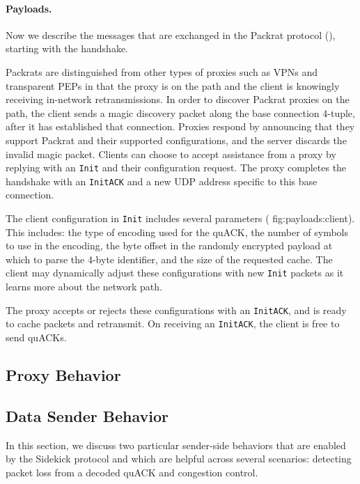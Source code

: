 

\paragraph{Payloads.} Now we describe the messages that are exchanged in the
Packrat protocol (), starting with the handshake.

Packrats are distinguished from other types of proxies such as VPNs and
transparent PEPs in that the proxy is on the path and the client is knowingly
receiving in-network retransmissions. In order to discover Packrat proxies on the
path, the client sends a magic discovery packet along the base connection
4-tuple, after it has established that connection. Proxies respond by
announcing that they support Packrat and their supported configurations, and the
server discards the invalid magic packet. Clients can choose to accept
assistance from a proxy by replying with an \texttt{Init} and their
configuration request. The proxy completes the handshake with an \texttt
{InitACK} and a new UDP address specific to this base connection.

The client configuration in \texttt{Init} includes several parameters (\Cref
{fig:payloads:client}). This includes: the type of encoding used for the quACK,
the number of symbols to use in the encoding, the byte offset in the randomly
encrypted payload at which to parse the 4-byte identifier, and the size of the
requested cache. The client may dynamically adjust these configurations with
new \texttt{Init} packets as it learns more about the network path.

The proxy accepts or rejects these configurations with an \texttt{InitACK}, and
is ready to cache packets and retransmit. On receiving an \texttt{InitACK}, the
client is free to send quACKs.

\subsection{Proxy Behavior}
\label{sec:sidekick:protocol:proxy-behavior}

\subsection{Data Sender Behavior}
\label{sec:sidekick:protocol:sender-behavior}

In this section, we discuss two particular sender-side behaviors that are enabled by
the Sidekick protocol and which are helpful across several scenarios: detecting packet loss
from a decoded quACK and congestion control.

